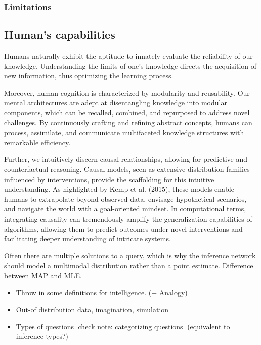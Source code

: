 \subsubsection{Limitations}

\subsection{Human's capabilities}
Humans naturally exhibit the aptitude to innately evaluate the reliability of our knowledge. Understanding the limits of one's knowledge directs the acquisition of new information, thus optimizing the learning process.

Moreover, human cognition is characterized by modularity and reusability. Our mental architectures are adept at disentangling knowledge into modular components, which can be recalled, combined, and repurposed to address novel challenges.
By continuously crafting and refining abstract concepts, humans can process, assimilate, and communicate multifaceted knowledge structures with remarkable efficiency.

Further, we intuitively discern causal relationships, allowing for predictive and counterfactual reasoning.
Causal models, seen as extensive distribution families influenced by interventions, provide the scaffolding for this intuitive understanding. As highlighted by Kemp et al. (2015), these models enable humans to extrapolate beyond observed data, envisage hypothetical scenarios, and navigate the world with a goal-oriented mindset. In computational terms, integrating causality can tremendously amplify the generalization capabilities of algorithms, allowing them to predict outcomes under novel interventions and facilitating deeper understanding of intricate systems.

Often there are multiple solutions to a query, which is why the inference network should model a multimodal distribution rather than a point estimate. Difference between MAP and MLE. 

\begin{itemize}
    \item Throw in some definitions for intelligence. (+ Analogy)
    \item Out-of distribution data, imagination, simulation
    \item Types of questions [check note: categorizing questions] (equivalent to inference types?)
\end{itemize} 

